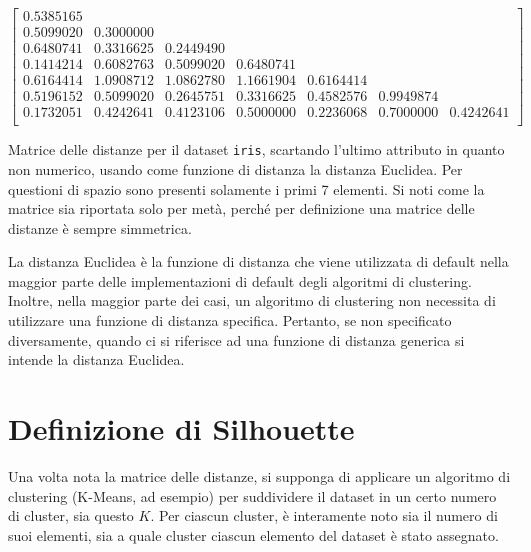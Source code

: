 \documentclass[a4paper, 12pt]{report}
\begin{document}
			\begin{table}[h]
				\begin{equation*}
					\begin{bmatrix}
						0.5385165 & & & & & & \\
						0.5099020 & 0.3000000 & & & & & \\
						0.6480741 & 0.3316625 & 0.2449490 & & & & \\
						0.1414214 & 0.6082763 & 0.5099020 & 0.6480741 & & & \\
						0.6164414 & 1.0908712 & 1.0862780 & 1.1661904 & 0.6164414 & & \\ 
						0.5196152 & 0.5099020 & 0.2645751 & 0.3316625 & 0.4582576 & 0.9949874 & \\ 
						0.1732051 & 0.4242641 & 0.4123106 & 0.5000000 & 0.2236068 & 0.7000000 & 0.4242641 \\
					\end{bmatrix}
				\end{equation*}

				\caption{Matrice delle distanze per il dataset \texttt{iris},
				scartando l'ultimo attributo in quanto non numerico, usando
				come funzione di distanza la distanza Euclidea. Per questioni
				di spazio sono presenti solamente i primi 7 elementi. Si noti
				come la matrice sia riportata solo per metà, perché per
				definizione una matrice delle distanze è sempre simmetrica.}
				\label{tab:dist}
			\end{table}

			La distanza Euclidea è la funzione di distanza che viene
			utilizzata di default nella maggior parte delle implementazioni
			di default degli algoritmi di clustering. Inoltre, nella maggior
			parte dei casi, un algoritmo di clustering non necessita di
			utilizzare una funzione di distanza specifica. Pertanto, se non
			specificato diversamente, quando ci si riferisce ad una funzione
			di distanza generica si intende la distanza Euclidea.

		\section{Definizione di Silhouette}

			Una volta nota la matrice delle distanze, si supponga di applicare
			un algoritmo di clustering (K-Means, ad esempio) per suddividere il
			dataset in un certo numero di cluster, sia questo $K$. Per ciascun
			cluster, è interamente noto sia il numero di suoi elementi, sia
			a quale cluster ciascun elemento del dataset è stato assegnato.
\end{document}
